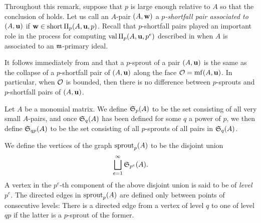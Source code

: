 \documentclass{amsart}
\begin{document}
\begin{remark}
   \label{sprouts as collapsed shortfall pairs: R}
   Throughout this remark, suppose that $p$ is large enough relative to $A$ so that the conclusion of  holds.
   Let us call an $A$-pair $(A,\mathbf{w})$ a \emph{$p$-shortfall pair associated to $(A,\mathbf{u})$} if $\mathbf{w} \in \operatorname{short} \Pi_p(A,\mathbf{u},p)$.
   Recall that $p$-shortfall pairs played an important role in the process for computing $\operatorname{val} \Pi_p(A,\mathbf{u},p^e)$ described in  when $A$ is associated to an $\mathfrak{m}$-primary ideal.

   It follows immediately from  and  that a $p$-sprout of a pair $(A,\mathbf{u})$ is the same as the collapse of a $p$-shortfall pair of $(A,\mathbf{u})$ along the face $\mathcal{O}=\operatorname{mf}(A,\mathbf{u})$.  In particular, when $\mathcal{O}$ is bounded, then there is no difference between $p$-sprouts and $p$-shortfall pairs of $(A,\mathbf{u})$.
\end{remark}

\begin{definition}
   Let $A$ be a monomial matrix.
   We define $\mathfrak{S}_p(A)$ to be the set consisting of all very small $A$-pairs, and once $\mathfrak{S}_q(A)$ has been defined for some $q$ a power of $p$, we then define $\mathfrak{S}_{qp}(A)$ to be the set consisting of all $p$-sprouts of all pairs in $\mathfrak{S}_q(A)$.

   We define the vertices of the graph $\operatorname{sprout}_p(A)$ to be the disjoint union
   \[ \bigsqcup_{e=1}^{\infty} \mathfrak{S}_{p^e}(A). \]
   A vertex in the $p^e$-th component of the above disjoint union is said to be of \emph{level} $p^e$.
   The directed edges in $\operatorname{sprout}_p(A)$ are defined only between points of consecutive levels:
   There is a directed edge from a vertex of level $q$ to one of level $qp$ if the latter is a $p$-sprout of the former.
\end{definition}
\end{document}
